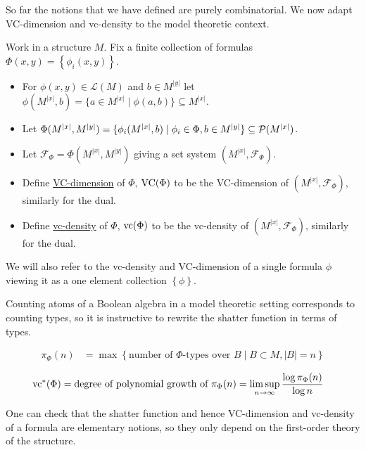 \documentclass{amsart}
\newcommand{\F}{\mathcal F}
\renewcommand{\LL}{\mathcal L}
\newcommand{\curly}[1]{\left\{#1\right\}}
\newcommand{\defn}{\underline}
\begin{document}
So far the notions that we have defined are purely combinatorial.
We now adapt VC-dimension and vc-density to the model theoretic context.

\begin{Definition}
  Work in a structure $M$.
  Fix a finite collection of formulas $\Phi(x, y) = \curly{\phi_i(x, y)}$.

  \begin{itemize}
  \item For $\phi(x, y) \in \LL(M)$ and $b \in M^{|y|}$ let $\phi(M^{|x|}, b) = \{a \in M^{|x|} \mid \phi(a, b)\} \subseteq M^{|x|}$.
  \item Let $\Phi(M^{|x|}, M^{|y|})= \{\phi_i(M^{|x|}, b) \mid \phi_i \in \Phi, b \in M^{|y|}\} \subseteq \mathcal P(M^{|x|})$.
  \item Let $\F_\Phi = \Phi(M^{|x|}, M^{|y|})$ giving a set system $(M^{|x|}, \F_\Phi)$.
  \item Define \defn{VC-dimension} of $\Phi$, $\operatorname{VC}(\Phi)$ to be the VC-dimension of $(M^{|x|}, \F_\Phi)$, similarly for the dual.
  \item Define \defn{vc-density} of $\Phi$, $\operatorname{vc}(\Phi)$ to be the vc-density of $(M^{|x|}, \F_\Phi)$, similarly for the dual.
  \end{itemize}

  We will also refer to the vc-density and VC-dimension of a single formula $\phi$
  viewing it as a one element collection $\curly{\phi}$.
\end{Definition}

Counting atoms of a Boolean algebra in a model theoretic setting corresponds to counting types,
so it is instructive to rewrite the shatter function in terms of types.

\begin{Definition} 
  \begin{align*}
    \pi_\Phi(n) &= \max \curly{\text{number of $\Phi$-types over $B$} \mid B \subset M, |B| = n}
  \end{align*}
\end{Definition}  

\begin{Lemma} \label{count_types}
  \begin{align*}
    \operatorname{vc}^*(\Phi) &= \text{degree of polynomial growth of $\pi_\Phi(n)$}  = \limsup_{n \to \infty}\frac{\log \pi_\Phi(n)}{\log n}
  \end{align*}  
\end{Lemma}

One can check that the shatter function and hence VC-dimension and vc-density of a formula are elementary notions,
so they only depend on the first-order theory of the structure.
\end{document}
